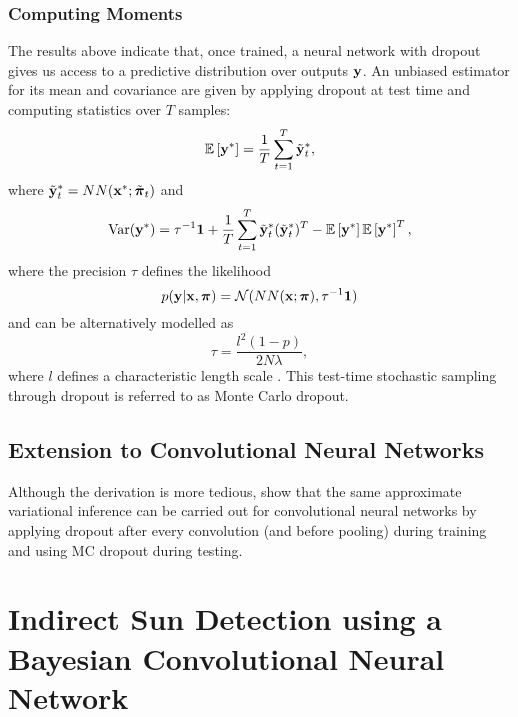 \subsubsection{Computing Moments}
The results above indicate that, once trained, a neural network with dropout gives us access to a predictive distribution over outputs $\boldsymbol{\mathbf{y}}$. An unbiased estimator for its mean and covariance are given by applying dropout at test time and computing statistics over $T$ samples:
\begin{equation}
\label{eq:sun_bcnn_mc_dropout_mean}
	\mathbb{E}\left[\boldsymbol{\mathbf{y}}^*\right] = \frac{1}{T} \sum_{t=1}^T \tilde{\boldsymbol{\mathbf{y}}}^*_t,
\end{equation}
where $\tilde{\boldsymbol{\mathbf{y}}}^*_t = NN(\boldsymbol{\mathbf{x}}^*; \tilde{\boldsymbol{\mathbf{\pi}}}_t)$ and
\begin{equation}
\label{eq:sun_bcnn_mc_dropout_variance}
	\text{Var}(\boldsymbol{\mathbf{y}}^*) = \tau^{-1} \boldsymbol{\mathbf{1}} +  \frac{1}{T} \sum_{t=1}^T \tilde{\boldsymbol{\mathbf{y}}}^*_t (\tilde{\boldsymbol{\mathbf{y}}}^*_t)^T - \mathbb{E}\left[\boldsymbol{\mathbf{y}}^*\right] \mathbb{E}\left[\boldsymbol{\mathbf{y}}^*\right]^T,
\end{equation}
where the precision $\tau$ defines the likelihood 
\begin{equation}
	p(\boldsymbol{\mathbf{y}} | \boldsymbol{\mathbf{x}}, \boldsymbol{\mathbf{\pi}}) = \mathcal{N}(NN(\boldsymbol{\mathbf{x}}; \boldsymbol{\mathbf{\pi}}),\tau^{-1}\boldsymbol{\mathbf{1}})	
\end{equation}
and can be alternatively modelled as
\begin{equation}
	\tau = \frac{l^2 (1 - p)}{2N\lambda},
\end{equation} 
where $l$ defines a characteristic length scale \citep{Gal2016UncertaintyThesis}. This test-time stochastic sampling through dropout is referred to as Monte Carlo dropout.

\subsection{Extension to Convolutional Neural Networks}
Although the derivation is more tedious, \cite{Gal2016UncertaintyThesis,Gal2016CNN} show that the same approximate variational inference can be carried out for convolutional neural networks by applying dropout after every convolution (and before pooling) during training and using MC dropout during testing.



\section{Indirect Sun Detection using a Bayesian Convolutional Neural Network} \label{sec:sun-bcnn}

